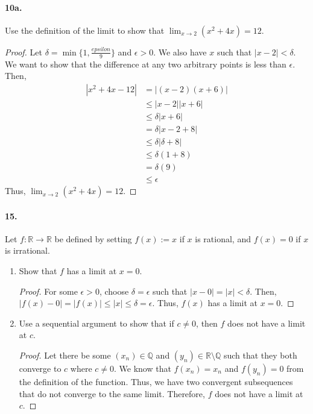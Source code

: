 \documentclass[12pt]{article}
\newcommand\R{\mathbb{R}}
\newcommand\Q{\mathbb{Q}}
\theoremstyle{remark}
\begin{document}
\paragraph{10a.} Use the definition of the limit to show that $\lim_{x \to 2} (x^2 + 4x) = 12$.
\begin{proof}
    Let $\delta = \min\{1, \frac{epsilon}{9}\}$ and $\epsilon > 0$. We also have $x$ such that $|x - 2| < \delta$. We want to show that the difference at any two arbitrary points is less than $\epsilon$. Then,
    \begin{align*}
        |x^2 + 4x - 12| &= |(x - 2)(x + 6)| \\
        &\leq |x - 2||x + 6| \\
        &\leq \delta|x + 6| \\
        &= \delta|x - 2 + 8| \\
        &\leq \delta|\delta + 8| \\
        &\leq \delta(1 + 8) \\
        &= \delta(9) \\
        &\leq \epsilon
    \end{align*}
    Thus, $\lim_{x \to 2} (x^2 + 4x) = 12$.
\end{proof}

\paragraph{15.} Let $f: \R \to \R$ be defined by setting $f(x) := x$ if $x$ is rational, and $f(x) = 0$ if $x$ is irrational.
\begin{enumerate}[label=(\alph*)]
    \item Show that $f$ has a limit at $x = 0$.
    \begin{proof}
        For some $\epsilon > 0$, choose $\delta = \epsilon$ such that $|x - 0| = |x| < \delta$. Then, $|f(x) - 0| = |f(x)| \leq |x| \leq \delta = \epsilon$. Thus, $f(x)$ has a limit at $x = 0$.
    \end{proof}

    \item Use a sequential argument to show that if $c \neq 0$, then $f$ does not have a limit at $c$.
    \begin{proof}
        Let there be some $(x_n) \in \Q$ and $(y_n) \in \R \setminus \Q$ such that they both converge to $c$ where $c \neq 0$. We know that $f(x_n) = x_n$ and $f(y_n) = 0$ from the definition of the function. Thus, we have two convergent subsequences that do not converge to the same limit. Therefore, $f$ does not have a limit at $c$.
    \end{proof}
\end{enumerate}
\end{document}
